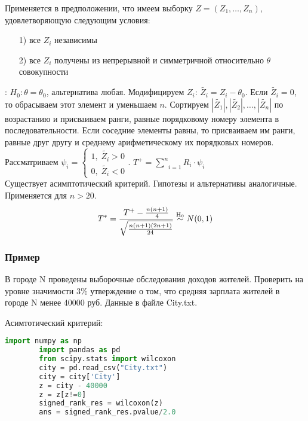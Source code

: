 Применяется в предположении, что имеем выборку $Z = (Z_1, \dots, Z_n)$, удовлетворяющую следующим условия:
\begin{itemize}
	\item[1)] все $Z_i$ независимы
	\item[2)] все $Z_i$ получены из непрерывной и симметричной относительно $\theta$ совокупности 
\end{itemize}
: $H_0: \theta = \theta_0$, альтернатива любая.
Модифицируем $Z_i$: $\tilde{Z_i} = Z_i - \theta_0$. Если $\tilde{Z_i} = 0$, то обрасываем этот элемент и уменьшаем $n$. Сортируем $|\tilde{Z_1}|, |\tilde{Z_2}|, \dots, |\tilde{Z_n}|$ по возрастанию и присваиваем ранги, равные порядковому номеру элемента в последовательности. Если соседние элементы равны, то присваиваем им ранги, равные друг другу и среднему арифметическому их порядковых номеров. Рассматриваем $\psi_i = \begin{cases}
	1, \; \tilde{Z_i} > 0 \\
	0, \; \tilde{Z_i} < 0 
\end{cases}$. $T^{+} = \underset{i=1}{\overset{n}{\sum}}R_i \cdot \psi_i$\\

Существует асимптотический критерий. Гипотезы и альтернативы аналогичные. Применяется для $n > 20$.
$$T^{*} = \frac{T^{+} - \frac{n(n+1)}{4}}{\sqrt{\frac{n(n+1)(2n+1)}{24}}} \mathrel{\stackrel{\rm H_0}\sim} N(0,1)$$

\subsubsection*{Пример}\label{cha:1sample/sec:neparam/subsec:znak/subsubsec:python}

\begin{problem}
	 В городе N проведены выборочные обследования доходов жителей. Проверить на уровне значимости 3$\%$ утверждение о том, что средняя зарплата жителей в городе N менее 40000 руб. Данные в файле City.txt.
\end{problem}
\begin{solution}
	Асимтотический критерий:
	\begin{lstlisting}[language=Python]
		import numpy as np
		import pandas as pd
		from scipy.stats import wilcoxon
		city = pd.read_csv("City.txt") 
		city = city['City']
		z = city - 40000
		z = z[z!=0]
		signed_rank_res = wilcoxon(z)
		ans = signed_rank_res.pvalue/2.0
	\end{lstlisting}
\end{solution}















